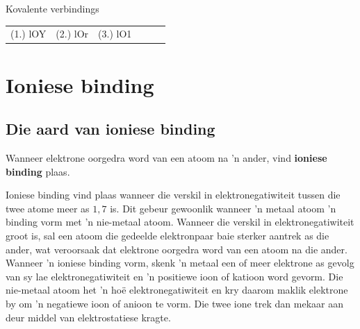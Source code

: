 \begin{exercises}{Kovalente verbindings}
{\practiceinfo
 \par \begin{tabular}[h]{cccccc}
 (1.) lOY  &  (2.) lOr  &  (3.) lO1  & \end{tabular}
}
\end{exercises}

         \section{Ioniese binding}
    \nopagebreak


            \subsection*{Die aard van ioniese binding}
            \nopagebreak
        \label{m38684*id142190}Wanneer elektrone oorgedra word van een atoom na  'n ander, vind \textbf{ioniese binding} plaas.\par 
        \label{m38684*id142218}
Ioniese binding vind plaas wanneer die verskil in elektronegatiwiteit tussen die twee atome meer as $1,7$ is. Dit gebeur gewoonlik wanneer  'n metaal atoom   'n binding vorm met  'n nie-metaal atoom. Wanneer die verskil in elektronegatiwiteit groot is, sal een atoom die gedeelde elektronpaar baie sterker aantrek as die ander, wat veroorsaak dat elektrone oorgedra word van een atoom na die ander. Wanneer   'n ioniese binding vorm, skenk   'n metaal een of meer elektrone as gevolg van sy lae elektronegatiwiteit en   'n positiewe ioon of katioon word gevorm. Die nie-metaal atoom het  'n hoë elektronegatiwiteit en kry daarom maklik elektrone by om   'n negatiewe ioon of anioon te vorm. Die twee ione trek dan mekaar aan deur middel van elektrostatiese kragte.\par 


